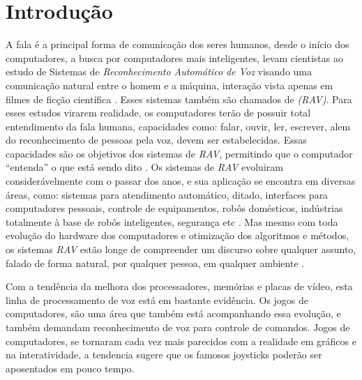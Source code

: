 \chapter{Introdução}

A fala é a principal forma de comunicação dos seres humanos, desde o início dos computadores, a busca por computadores mais inteligentes, levam cientistas ao estudo de Sistemas de \textit {Reconhecimento Automático de Voz} visando uma comunicação natural entre o homem e a máquina, interação vista apenas em filmes de ficção científica \cite{RavPtBr}. Esses sistemas também são chamados de \textit{(RAV)}. 
Para esses estudos virarem realidade, os computadores terão de possuir total entendimento da fala humana, capacidades como: falar, ouvir, ler, escrever, alem do reconhecimento de pessoas pela voz, devem ser estabelecidas. Essas capacidades são os objetivos dos sistemas de \textit{RAV}, permitindo que o computador “entenda” o que está sendo dito \cite{RvPatrick}.
Os sistemas de \textit{RAV} evoluiram considerávelmente com o passar dos anos, e sua aplicação se encontra em diversas áreas, como: sistemas para atendimento automático, ditado, interfaces para computadores pessoais, controle de equipamentos, robôs domésticos, indústrias totalmente à base de robôs inteligentes, segurança etc \cite{RavPtBr}. Mas mesmo com toda evolução do hardware dos computadores e otimização dos algoritmos e métodos, os sistemas \textit{RAV} estão longe de compreender um discurso sobre qualquer assunto, falado de forma natural, por qualquer pessoa, em qualquer ambiente \cite{RavIsoladas}. 

Com a tendência da melhora dos processadores, memórias e placas de vídeo, esta linha de processamento de voz está em bastante evidência. Os jogos de computadores, são uma área que também está acompanhando essa evolução, e também demandam reconhecimento de voz para controle de comandos. Jogos de computadores, se tornaram cada vez mais parecidos com a realidade em gráficos e na interatividade, a tendencia sugere que os famosos joysticks poderão ser aposentados em pouco tempo.

